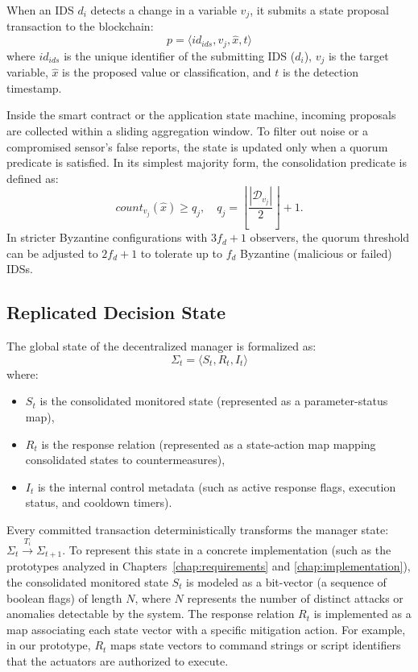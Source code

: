 When an IDS $d_i$ detects a change in a variable $v_j$, it submits a state proposal transaction to the blockchain:
\[
p = \langle id_{ids}, v_j, \hat{x}, t \rangle
\]
where $id_{ids}$ is the unique identifier of the submitting IDS ($d_i$), $v_j$ is the target variable, $\hat{x}$ is the proposed value or classification, and $t$ is the detection timestamp.

Inside the smart contract or the application state machine, incoming proposals are collected within a sliding aggregation window. To filter out noise or a compromised sensor's false reports, the state is updated only when a quorum predicate is satisfied. In its simplest majority form, the consolidation predicate is defined as:
\[
count_{v_j}(\hat{x}) \ge q_j, \quad q_j = \left\lfloor\frac{|\mathcal{D}_{v_j}|}{2}\right\rfloor + 1.
\]
In stricter Byzantine configurations with $3f_d + 1$ observers, the quorum threshold can be adjusted to $2f_d + 1$ to tolerate up to $f_d$ Byzantine (malicious or failed) IDSs. 


\subsection{Replicated Decision State}
\label{subsec:replicated_decision_state}

The global state of the decentralized manager is formalized as:
\[
\Sigma_t = \langle S_t, R_t, I_t \rangle
\]
where:
\begin{itemize}
    \item $S_t$ is the consolidated monitored state (represented as a parameter-status map),
    \item $R_t$ is the response relation (represented as a state-action map mapping consolidated states to countermeasures),
    \item $I_t$ is the internal control metadata (such as active response flags, execution status, and cooldown timers).
\end{itemize}

Every committed transaction deterministically transforms the manager state: $\Sigma_t \xrightarrow{T_i} \Sigma_{t+1}$. 
To represent this state in a concrete implementation (such as the prototypes analyzed in Chapters~\ref{chap:requirements} and \ref{chap:implementation}), the consolidated monitored state $S_t$ is modeled as a bit-vector (a sequence of boolean flags) of length $N$, where $N$ represents the number of distinct attacks or anomalies detectable by the system. The response relation $R_t$ is implemented as a map associating each state vector with a specific mitigation action. For example, in our prototype, $R_t$ maps state vectors to command strings or script identifiers that the actuators are authorized to execute.


